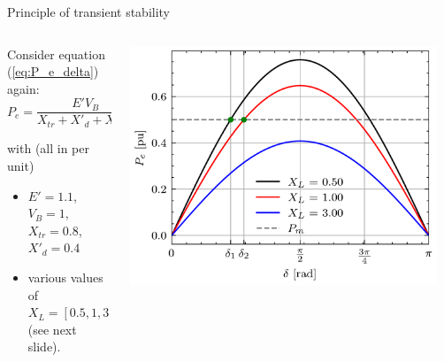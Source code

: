 \begin{frame}{Principle of transient stability}
\begin{columns}
    \begin{column}{0.5\textwidth}
        Consider equation (\ref{eq:P_e_delta}) again:
        $$P_e = \frac{E' V_B}{X_{tr}+X'_d + X_L/2} \sin(\delta)$$

        with (all in per unit)
        \begin{itemize}
            \item $E' = 1.1$, $V_B = 1$, $X_{tr} = 0.8$, $X'_d = 0.4$ 
            \item various values of $X_L = [0.5,1,3]$ (see next slide).
        \end{itemize}
    \end{column}
    \begin{column}{0.5\textwidth}
        \begin{center}
        \includegraphics[width=0.95\textwidth]{images/P-delta.png}
        \end{center}
    \end{column}
\end{columns}
\end{frame}

